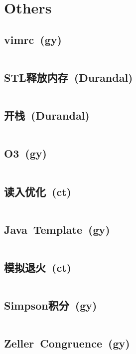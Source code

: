 \chapter{Others}
\section{vimrc\ \small(gy)}
	\inputminted{vim}{Others/.vimrc}
\section{STL释放内存\ \small(Durandal)}
	\inputminted{cpp}{Others/stl_clear.cpp}
\section{开栈\ \small(Durandal)}
	\inputminted{cpp}{Others/rsp.cpp}
\section{O3\ \small(gy)}
	\inputminted{cpp}{Others/o3.cpp}
\section{读入优化\ \small(ct)}
    \inputminted{cpp}{Others/input_optimize.cpp}
\section{Java\ Template\ \small(gy)}
	\inputminted{java}{Others/Template.java}
\section{模拟退火\ \small(ct)}
	\inputminted{cpp}{Others/simulated_annealing.cpp}
\section{Simpson积分\ \small(gy)}
	\inputminted{cpp}{Others/simpson.cpp}
\section{Zeller\ Congruence\ \small(gy)}
	\inputminted{cpp}{Others/zeller_congruence.cpp}
